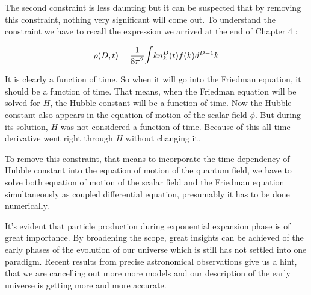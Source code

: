 The second constraint is less daunting but it can be suspected that by removing this constraint, nothing very significant will come out. To understand the constraint we have to recall the expression we arrived at the end of Chapter 4 :

\begin{equation*}
\rho(D,t) = \frac{1}{8\pi^2} \mathlarger{\mathlarger{\int}}kn^D_k(t)f(k)d^{D-1}k
\end{equation*}

It is clearly a function of time. So when it will go into the Friedman equation, it should be a function of time. That means, when the Friedman equation will be solved for $H$, the Hubble constant will be a function of time. Now the Hubble constant also appears in the equation of motion of the scalar field $\phi$. But during its solution, $H$ was not considered a function of time. Because of this all time derivative went right through $H$ without changing it. 

To remove this constraint, that means to incorporate the time dependency of Hubble constant into the equation of motion of the quantum field, we have to solve both equation of motion of the scalar field and the Friedman equation simultaneously as coupled differential equation, presumably it has to be done numerically.

It's evident that particle production during exponential expansion phase is of great importance. By broadening the scope, great insights can be achieved of the early phases of the evolution of our universe which is still has not settled into one paradigm. Recent results from precise astronomical observations give us a hint, that we are cancelling out more more models and our description of the early universe is getting more and more accurate.